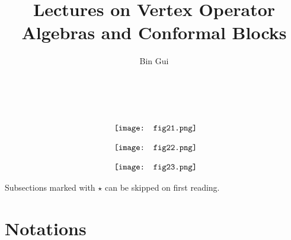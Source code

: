 \documentclass[12pt,a4paper,notitlepage]{article}
\title{Lectures on Vertex Operator Algebras and Conformal Blocks}
\author{{\sc Bin Gui}
}
\theoremstyle{definition}
\theoremstyle{plain}
\numberwithin{equation}{section}
\begin{document}
\sloppy %
	\setcounter{page}{0}
	






	
	\maketitle
\thispagestyle{empty}	
\begin{gather*}
{~}\\[3ex]
	\vcenter{\hbox{{
				\texttt{[image: fig21.png]}}}}\\[2ex]
	\vcenter{\hbox{{
				\texttt{[image: fig22.png]}}}}\\[2ex]
	\vcenter{\hbox{{
				\texttt{[image: fig23.png]}}}}
\end{gather*}




	
	\newpage
\tableofcontents
	








\newpage
	
Subsections marked with $\star$ can be skipped on first reading.

\section*{Notations}
\end{document}
